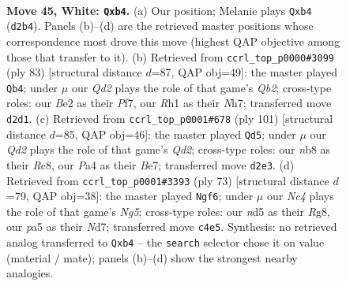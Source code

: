 \documentclass[11pt]{article}
\begin{document}
\clearpage

\begin{figure}[p]\centering
\begin{subfigure}{0.46\textwidth}\centering
\resizebox{\linewidth}{!}{%
\newchessgame
\chessboard[
  setfen={rnb5/1p4k1/4p3/p2n1pNp/PqN2P2/1P4P1/3QB1KP/7R w - - 2 45},
  showmover=false,
  pgfstyle=straightmove, color=movearrow, markmove={d2-b4}
]}
\caption{}
\end{subfigure}\hfill
\begin{subfigure}{0.46\textwidth}\centering
\resizebox{\linewidth}{!}{%
\newchessgame
\chessboard[
  setfen={6k1/1q3ppn/4p1n1/p1p3P1/P1P1QP2/1rN1P3/8/3RB1K1 b - - 4 42},
  showmover=false,
  pgfstyle=straightmove, color=movearrow, markmove={b7-b4}
]}
\caption{}
\end{subfigure}
\\[4pt]
\begin{subfigure}{0.46\textwidth}\centering
\resizebox{\linewidth}{!}{%
\newchessgame
\chessboard[
  setfen={2r5/3qbkp1/4pp2/p5p1/Pn1QN1Pn/4P2P/5P2/BR4KB b - - 8 51},
  showmover=false,
  pgfstyle=straightmove, color=movearrow, markmove={d7-d5}
]}
\caption{}
\end{subfigure}\hfill
\begin{subfigure}{0.46\textwidth}\centering
\resizebox{\linewidth}{!}{%
\newchessgame
\chessboard[
  setfen={6r1/1kpn2q1/bpNp4/p2P1P2/P1PQ1Rn1/6B1/6BP/6K1 b - - 6 37},
  showmover=false,
  pgfstyle=straightmove, color=movearrow, markmove={g4-f6}
]}
\caption{}
\end{subfigure}
\caption{\textbf{Move 45, White: \texttt{Qxb4}.} (a) Our position; Melanie plays \texttt{Qxb4} (\texttt{d2b4}). Panels (b)--(d) are the retrieved master positions whose correspondence most drove this move (highest QAP objective among those that transfer to it). (b) Retrieved from \texttt{ccrl\_top\_p0000\#3099} (ply 83) [structural distance $d$=87, QAP obj=49]: the master played \texttt{Qb4}; under $\mu$ our \emph{Qd2} plays the role of that game's \emph{Qb2}; cross-type roles: our \emph{B}e2 as their \emph{P}f7, our \emph{R}h1 as their \emph{N}h7; transferred move \texttt{d2d1}. (c) Retrieved from \texttt{ccrl\_top\_p0001\#678} (ply 101) [structural distance $d$=85, QAP obj=46]: the master played \texttt{Qd5}; under $\mu$ our \emph{Qd2} plays the role of that game's \emph{Qd2}; cross-type roles: our \emph{n}b8 as their \emph{R}c8, our \emph{P}a4 as their \emph{B}e7; transferred move \texttt{d2e3}. (d) Retrieved from \texttt{ccrl\_top\_p0001\#3393} (ply 73) [structural distance $d$=79, QAP obj=38]: the master played \texttt{Ngf6}; under $\mu$ our \emph{Nc4} plays the role of that game's \emph{Ng5}; cross-type roles: our \emph{n}d5 as their \emph{R}g8, our \emph{p}a5 as their \emph{N}d7; transferred move \texttt{c4e5}. Synthesis: no retrieved analog transferred to \texttt{Qxb4} -- the \texttt{search} selector chose it on value (material / mate); panels (b)--(d) show the strongest nearby analogies.}
\label{fig:thought-m88}
\end{figure}
\end{document}
